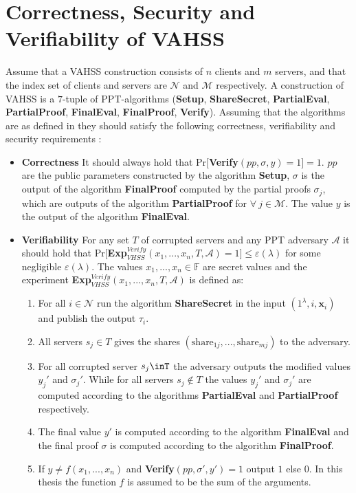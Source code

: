 \chapter{Correctness, Security and Verifiability of VAHSS}
\label{Appendix:CSV-VAHSS}

Assume that a VAHSS construction consists of $n$ clients and $m$ servers, and that the index set of clients and servers are $\mathcal{N}$ and $\mathcal{M}$ respectively.   A construction of VAHSS is a $7$-tuple of PPT-algorithms (\textbf{Setup}, \textbf{ShareSecret}, \textbf{PartialEval}, \textbf{PartialProof}, \textbf{FinalEval}, \textbf{FinalProof}, \textbf{Verify}). Assuming that the algorithms are as defined in \cite{SumItUp} they should satisfy the following correctness, verifiability and security requirements \cite{SumItUp}:

\begin{itemize}
\item \textbf{Correctness} It should always hold that Pr$[$\textbf{Verify}$(pp,\sigma,y)=1]=1$. $pp$ are the public parameters constructed by the algorithm \textbf{Setup}, $\sigma$ is the output of the algorithm \textbf{FinalProof} computed by the partial proofs $\sigma_j$, which are outputs of the algorithm \textbf{PartialProof} for $\forall\:  j\in\mathcal{M} $. The value $y$ is the output of the algorithm \textbf{FinalEval}.

\item \textbf{Verifiability}
For any set $T$ of corrupted servers and any PPT adversary $\mathcal{A}$ it should hold that Pr$[$\textbf{Exp}$_{VHSS}^{Verify}(x_1,...,x_n,T,\mathcal{A})=1]\leq\varepsilon (\lambda)$ for some negligible $\varepsilon(\lambda)$. The values $x_1,...,x_n\in\mathds{F}$ are secret values and the experiment \textbf{Exp}$_{VHSS}^{Verify}(x_1,...,x_n,T,\mathcal{A})$ is defined as:
\begin{enumerate}
\item For all $i\in\mathcal{N}$ run the algorithm \textbf{ShareSecret} in the input $(1^\lambda,i,\mathbf{x}_i)$ and publish the output $\tau_i$.
\item All servers $s_j\in T$ gives the shares $(\text{share}_{1j}, ..., \text{share}_{mj})$ to the adversary.   
\item For all corrupted server $s_j\inT$ the adversary outputs the modified values $y_j'$ and $\sigma_j'$. While for all servers $s_j\notin T$ the values $y_j'$ and $\sigma_j'$ are computed according to the algorithms \textbf{PartialEval} and \textbf{PartialProof} respectively.
\item The final value $y'$ is computed according to the algorithm \textbf{FinalEval} and the final proof $\sigma$ is computed according to the algorithm \textbf{FinalProof}. 
\item If $y \neq f(x_1,...,x_n) $ and \textbf{Verify}$(pp,\sigma',y')=1$ output $1$ else $0$. In this thesis the function $f$ is assumed to be the sum of the arguments.
\end{enumerate}


\end{itemize}
